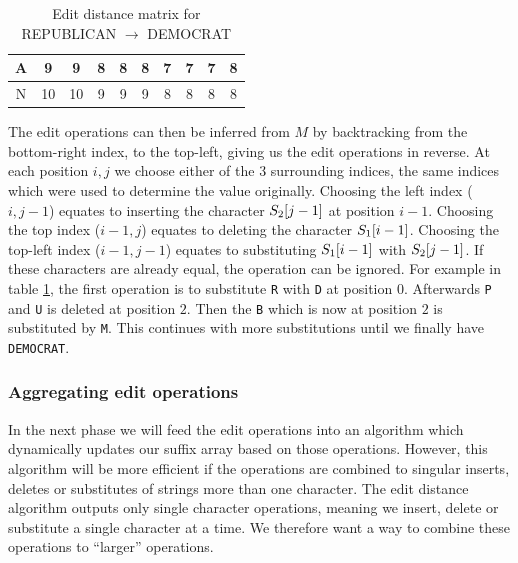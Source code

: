\begin{table}
\begin{center}
\begin{tabular}[c]{c|c|c|c|c|c|c|c|c|c|}
			A & 9                    & 9                    & 8                    & 8                    & 8                    & 7                    & 7                    & \cellcolor{blue!25}7 & 8                    \\\hline
			N & 10                   & 10                   & 9                    & 9                    & 9                    & 8                    & 8                    & 8                    & \cellcolor{blue!25}8 \\\hline

			\hline
		\end{tabular}
	\end{center}
	\caption{Edit distance matrix for REPUBLICAN $\rightarrow$ DEMOCRAT}
	\label{tab:wagnerfischermatrix}
\end{table}


The edit operations can then be inferred from $M$ by backtracking from the bottom-right
index, to the top-left, giving us the edit operations in reverse. At each position $i, j$
we choose either of the 3 surrounding indices, the same indices which were used to
determine the value originally. Choosing the left index ($i, j - 1$) equates to inserting
the character $S_2[{j - 1}]$ at position $i - 1$. Choosing the top index ($i -
1, j$) equates to deleting the character $S_1[{i - 1}]$. Choosing the top-left
index ($i - 1, j - 1$) equates to substituting $S_1[{i - 1}]$ with
$S_2[{j - 1}]$. If these characters are already equal, the operation can be
ignored. For example in table \ref{tab:wagnerfischermatrix}, the first operation is to
substitute \verb|R| with \verb|D| at position $0$. Afterwards \verb|P| and \verb|U| is
deleted at position $2$. Then the \verb|B| which is now at position $2$ is substituted by
\verb|M|. This continues with more substitutions until we finally have \verb|DEMOCRAT|.

\subsubsection{Aggregating edit operations}

In the next phase we will feed the edit operations into an algorithm which dynamically
updates our suffix array based on those operations. However, this algorithm will be more
efficient if the operations are combined to singular inserts, deletes or substitutes of
strings more than one character. The edit distance algorithm outputs only single character
operations, meaning we insert, delete or substitute a single character at a time. We
therefore want a way to combine these operations to ``larger'' operations.

